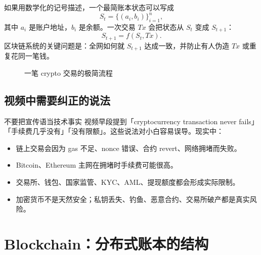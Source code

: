 \documentclass[UTF8,11pt]{ctexart}
\begin{document}
如果用数学化的记号描述，一个最简账本状态可以写成
\[
S_t = \{(a_i, b_i)\}_{i=1}^n,
\]
其中 \(a_i\) 是账户地址，\(b_i\) 是余额。一次交易 \(Tx\) 会把状态从 \(S_t\) 变成 \(S_{t+1}\)：
\[
S_{t+1} = f(S_t, Tx).
\]
区块链系统的关键问题是：全网如何就 \(S_{t+1}\) 达成一致，并防止有人伪造 \(Tx\) 或重复花同一笔钱。

\begin{figure}[h]
\centering
{}
\caption{一笔 crypto 交易的极简流程}
\end{figure}

\subsection{视频中需要纠正的说法}

\begin{warnbox}{不要把宣传语当技术事实}
视频早段提到「cryptocurrency transaction never fails」「手续费几乎没有」「没有限额」。这些说法对小白容易误导。现实中：
\begin{itemize}
  \item 链上交易会因为 gas 不足、nonce 错误、合约 revert、网络拥堵而失败。
  \item Bitcoin、Ethereum 主网在拥堵时手续费可能很高。
  \item 交易所、钱包、国家监管、KYC、AML、提现额度都会形成实际限制。
  \item 加密货币不是天然安全；私钥丢失、钓鱼、恶意合约、交易所破产都是真实风险。
\end{itemize}
\end{warnbox}

\section{Blockchain：分布式账本的结构}
\end{document}
